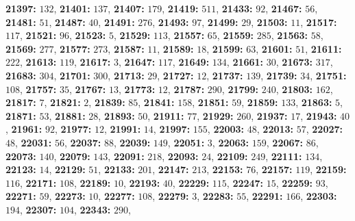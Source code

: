 \textsf{\bfseries 21397:} $132$, \textsf{\bfseries 21401:} $137$, \textsf{\bfseries 21407:} $179$, \textsf{\bfseries 21419:} $511$, \textsf{\bfseries 21433:} $92$, \textsf{\bfseries 21467:} $56$, \textsf{\bfseries 21481:} $51$, \textsf{\bfseries 21487:} $40$, \textsf{\bfseries 21491:} $276$, \textsf{\bfseries 21493:} $97$, \textsf{\bfseries 21499:} $29$, \textsf{\bfseries 21503:} $11$, \textsf{\bfseries 21517:} $117$, \textsf{\bfseries 21521:} $96$, \textsf{\bfseries 21523:} $5$, \textsf{\bfseries 21529:} $113$, \textsf{\bfseries 21557:} $65$, \textsf{\bfseries 21559:} $285$, \textsf{\bfseries 21563:} $58$, \textsf{\bfseries 21569:} $277$, \textsf{\bfseries 21577:} $273$, \textsf{\bfseries 21587:} $11$, \textsf{\bfseries 21589:} $18$, \textsf{\bfseries 21599:} $63$, \textsf{\bfseries 21601:} $51$, \textsf{\bfseries 21611:} $222$, \textsf{\bfseries 21613:} $119$, \textsf{\bfseries 21617:} $3$, \textsf{\bfseries 21647:} $117$, \textsf{\bfseries 21649:} $134$, \textsf{\bfseries 21661:} $30$, \textsf{\bfseries 21673:} $317$, \textsf{\bfseries 21683:} $304$, \textsf{\bfseries 21701:} $300$, \textsf{\bfseries 21713:} $29$, \textsf{\bfseries 21727:} $12$, \textsf{\bfseries 21737:} $139$, \textsf{\bfseries 21739:} $34$, \textsf{\bfseries 21751:} $108$, \textsf{\bfseries 21757:} $35$, \textsf{\bfseries 21767:} $13$, \textsf{\bfseries 21773:} $12$, \textsf{\bfseries 21787:} $290$, \textsf{\bfseries 21799:} $240$, \textsf{\bfseries 21803:} $162$, \textsf{\bfseries 21817:} $7$, \textsf{\bfseries 21821:} $2$, \textsf{\bfseries 21839:} $85$, \textsf{\bfseries 21841:} $158$, \textsf{\bfseries 21851:} $59$, \textsf{\bfseries 21859:} $133$, \textsf{\bfseries 21863:} $5$, \textsf{\bfseries 21871:} $53$, \textsf{\bfseries 21881:} $28$, \textsf{\bfseries 21893:} $50$, \textsf{\bfseries 21911:} $77$, \textsf{\bfseries 21929:} $260$, \textsf{\bfseries 21937:} $17$, \textsf{\bfseries 21943:} $40$, \textsf{\bfseries 21961:} $92$, \textsf{\bfseries 21977:} $12$, \textsf{\bfseries 21991:} $14$, \textsf{\bfseries 21997:} $155$, \textsf{\bfseries 22003:} $48$, \textsf{\bfseries 22013:} $57$, \textsf{\bfseries 22027:} $48$, \textsf{\bfseries 22031:} $56$, \textsf{\bfseries 22037:} $88$, \textsf{\bfseries 22039:} $149$, \textsf{\bfseries 22051:} $3$, \textsf{\bfseries 22063:} $159$, \textsf{\bfseries 22067:} $86$, \textsf{\bfseries 22073:} $140$, \textsf{\bfseries 22079:} $143$, \textsf{\bfseries 22091:} $218$, \textsf{\bfseries 22093:} $24$, \textsf{\bfseries 22109:} $249$, \textsf{\bfseries 22111:} $134$, \textsf{\bfseries 22123:} $14$, \textsf{\bfseries 22129:} $51$, \textsf{\bfseries 22133:} $201$, \textsf{\bfseries 22147:} $213$, \textsf{\bfseries 22153:} $76$, \textsf{\bfseries 22157:} $119$, \textsf{\bfseries 22159:} $116$, \textsf{\bfseries 22171:} $108$, \textsf{\bfseries 22189:} $10$, \textsf{\bfseries 22193:} $40$, \textsf{\bfseries 22229:} $115$, \textsf{\bfseries 22247:} $15$, \textsf{\bfseries 22259:} $93$, \textsf{\bfseries 22271:} $59$, \textsf{\bfseries 22273:} $10$, \textsf{\bfseries 22277:} $108$, \textsf{\bfseries 22279:} $3$, \textsf{\bfseries 22283:} $55$, \textsf{\bfseries 22291:} $166$, \textsf{\bfseries 22303:} $194$, \textsf{\bfseries 22307:} $104$, \textsf{\bfseries 22343:} $290$, 
